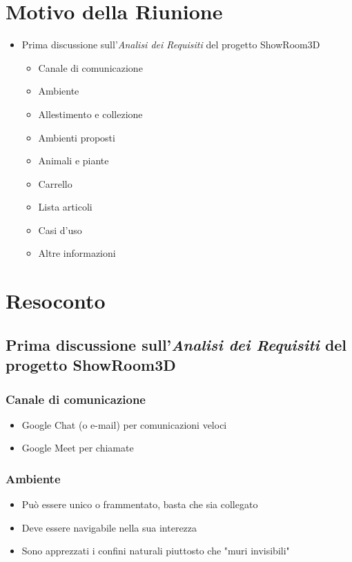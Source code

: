 \section{Motivo della Riunione}
\begin{itemize}
    \item Prima discussione sull'\textit{Analisi dei Requisiti} del progetto ShowRoom3D
    \begin{itemize}
        \item Canale di comunicazione
        \item Ambiente
        \item Allestimento e collezione
        \item Ambienti proposti
        \item Animali e piante
        \item Carrello
        \item Lista articoli
        \item Casi d'uso
        \item Altre informazioni
    \end{itemize}
\end{itemize}
\section{Resoconto}
\subsection{Prima discussione sull'\textit{Analisi dei Requisiti} del progetto ShowRoom3D}
\subsubsection{Canale di comunicazione}
\begin{itemize}
    \item Google Chat (o e-mail) per comunicazioni veloci
    \item Google Meet per chiamate
\end{itemize}
\subsubsection{Ambiente}
\begin{itemize}
    \item Può essere unico o frammentato, basta che sia collegato
    \item Deve essere navigabile nella sua interezza 
    \item Sono apprezzati i confini naturali piuttosto che "muri invisibili"
\end{itemize}

